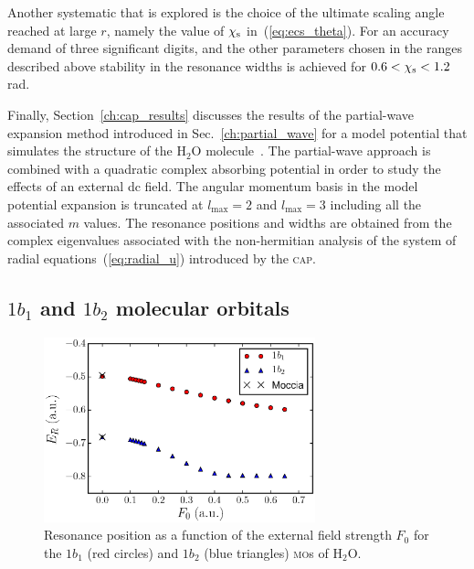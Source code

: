 Another systematic that is explored is the choice of the ultimate
scaling angle reached at large $r$, namely the value of
$\chi_{\rm{s}}$ in~(\ref{eq:ecs_theta}). For an accuracy demand of
three significant digits, and the other parameters chosen in the
ranges described above stability in the resonance widths is achieved
for $0.6< \chi_{\rm{s}} < 1.2$ rad.

Finally, Section~\ref{ch:cap_results} discusses the results of the
partial-wave expansion method introduced in Sec.~\ref{ch:partial_wave}
for a model potential that simulates the structure of the H$_{2}$O
molecule~\cite{illescas_modelV_2011}. The partial-wave approach is
combined with a quadratic complex absorbing potential in order to
study the effects of an external dc field. The angular momentum basis
in the model potential expansion is truncated at $l_{\mathrm{max}} =
2$ and $l_{\mathrm{max}} = 3$ including all the associated $m$
values. The resonance positions and widths are obtained from the
complex eigenvalues associated with the non-hermitian analysis of the
system of radial equations~(\ref{eq:radial_u}) introduced by the
\textsc{cap}.


\subsection{$1b_{1}$ and $1b_{2}$ molecular orbitals}
\label{ch:1b1_1b2_results}


\begin{figure}
  \centering
  \includegraphics[width=0.7\textwidth]{figures/ch_H2O/1b1_1b2/resPositionvsF1b11b2.eps}
  \caption{Resonance position as a function of the external field
    strength $F_{0}$ for the $1b_{1}$ (red circles) and $1b_{2}$ (blue
    triangles) \textsc{mo}s of H$_{2}$O.}
  \label{fig:1b11b2_position}
\end{figure}

